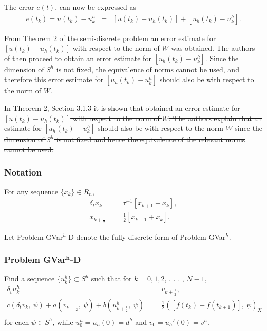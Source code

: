 \documentclass[../../main.tex]{subfiles}
\begin{document}
The error $e(t)$, can now be expressed as
\begin{eqnarray}
	e(t_k) = u(t_k) - u^h_k & = & [u(t_k)-u_h(t_k)] + [u_h(t_k) - u^h_k]. \label{error_e}
\end{eqnarray}


From Theorem 2 of the semi-discrete problem an error estimate for $[u(t_k)-u_h(t_k)]$ with respect to the norm of $W$ was obtained. The authors of \cite{BV13} then proceed to obtain an error estimate for $[u_h(t_k) - u^h_k]$. Since the dimension of $S^h$ is not fixed, the equivalence of norms cannot be used, and therefore this error estimate for $[u_h(t_k) - u^h_k]$ should also be with respect to the norm of $W$.

\sout{In Theorem 2, Section 3.1.3 it is shown that \cite{BV13} obtained an error estimate for $[u(t_k)-u_h(t_k)]$ with respect to the norm of $W$. The authors explain that an estimate for $[u_h(t_k) - u^h_k]$ should also be with respect to the norm $W$ since the dimension of $S^h$ is not fixed and hence the equivalence of the relevant norms cannot be used.}\\

\subsubsection{Notation}
For any sequence $\{x_k\} \in R_n$,
\begin{eqnarray*}
	\delta_{t}x_{k}& = &\tau^{-1}[x_{k+1}-x_{k}],\\
	x_{k+\frac{1}{2}} & = & \frac{1}{2}[x_{k+1}+x_{k}].
\end{eqnarray*}

Let Problem GVar$^h$-D denote the fully discrete form of Problem GVar$^h$.
\subsubsection*{Problem GVar$^\mathbf{{h}}$-D}
Find a sequence $\{u_{k}^{h}\}\subset S^{h}$ such that for $k=0,1,2$, . . . , $N-1,$
\begin{eqnarray}
	\delta_{t}u_{k}^{h}\ & = & v_{k+\frac{1}{2}},\\
	c(\delta_{t}v_{k},\ \psi)+a(v_{k+\frac{1}{2}},\ \psi)+b(u_{k+\frac{1}{2}}^{h},\ \psi) & = & \frac{1}{2}([f(t_{k})+f(t_{k+1})],\ \psi)_{X} \nonumber \\ \label{PP}
\end{eqnarray}
for each $\psi\in S^{h}$, while $u_{0}^{h}=u_{h}(0)=d^{h}$ and $v_{0}=u_{h}'(0)=v^{h}$.\\
\end{document}
